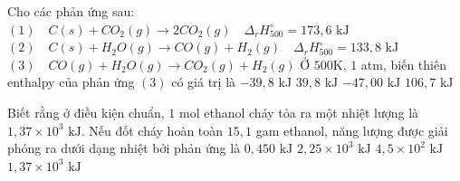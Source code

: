 \documentclass[Main.tex]{subfiles}
\begin{document}
	\begin{ex}
		 Cho các phản ứng sau:
		$(1) \quad C (s) + CO_2 (g) \longrightarrow 2CO_2 (g) \quad \Delta_r H_{500}^{\circ} = 173{,}6 \text{ kJ}$
		$(2) \quad C (s) + H_2O (g) \longrightarrow CO (g) + H_2 (g) \quad \Delta_r H_{500}^{\circ} = 133{,}8 \text{ kJ}$
		$(3) \quad CO (g) + H_2O (g) \longrightarrow CO_2 (g) + H_2 (g)$
		Ở $500$K, $1$ atm, biến thiên enthalpy của phản ứng $(3)$ có giá trị là
		{\True $-39{,}8 \text{ kJ}$}
		{$39{,}8 \text{ kJ}$}
		{$-47{,}00 \text{ kJ}$}
		{$106{,}7 \text{ kJ}$}
	\end{ex}
	\begin{ex}
		[CD – SBT] Biết rằng ở điều kiện chuẩn, $1$ mol ethanol cháy tỏa ra một nhiệt lượng là $1{,}37 \times 10^3 \text{ kJ}$. Nếu đốt cháy hoàn toàn $15{,}1$ gam ethanol, năng lượng được giải phóng ra dưới dạng nhiệt bởi phản ứng là
		{$0{,}450 \text{ kJ}$}
		{$2{,}25 \times 10^3 \text{ kJ}$}
		{\True $4{,}5 \times 10^2 \text{ kJ}$}
		{$1{,}37 \times 10^3 \text{ kJ}$}
	\end{ex}
	
\end{document}
